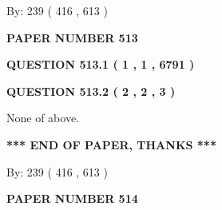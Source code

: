 \documentclass[12pt]{article}
\begin{document}
   
\hspace{1.0in} By: 
 239 ( 416 ,  613 )
   
   
   
   
\newpage 
\setcounter{page}{ 
   513001 } 
   
   
   
   
 {\textbf{ \Large{ PAPER NUMBER  513  }}}
   
   
\vspace{0.2in}
   
   
   
   
   
   
 \vspace{0.2in}
 
 
 
 
   
   
  
\vspace{0.2in}
  
{\textbf{\Large{QUESTION
513.1 
 ( 1 , 1 , 6791 )
}}}
  
  
  
\vspace{0.2in}
  
{\textbf{\Large{QUESTION
513.2 
 ( 2 , 2 , 3 )
}}}
  
  
 
 
\noindent{}
 
 
 None of above.
 
 
 
 
   
   
 \vspace{0.2in}
 
   
   
   
   
\vspace{1.0in} 
{\textbf{\large{ *** END OF PAPER, THANKS *** }}} 
   
   
\hspace{1.0in} By: 
 239 ( 416 ,  613 )
   
   
   
   
\newpage 
\setcounter{page}{ 
   514001 } 
   
   
   
   
 {\textbf{ \Large{ PAPER NUMBER  514  }}}
   
   
\vspace{0.2in}
   
\end{document}
